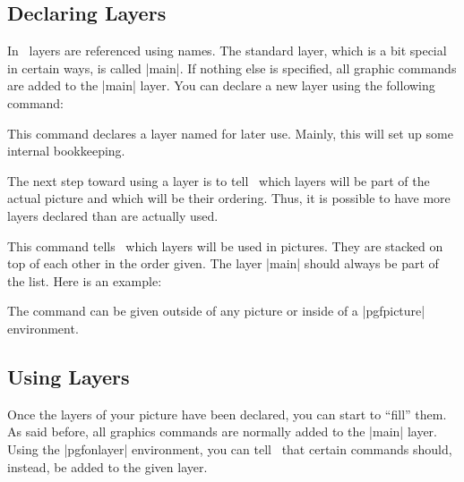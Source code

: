 \subsection{Declaring Layers}

In \pgfname\ layers are referenced using names. The standard layer,
which is a bit special in certain ways, is called |main|. If nothing
else is specified, all graphic commands are added to the |main|
layer. You can declare a new layer using the following command:

\begin{command}{\pgfdeclarelayer{}}
  This command declares a layer named  for later
  use. Mainly, this will set up some internal bookkeeping.
\end{command}

The next step toward using a layer is to tell \pgfname\ which layers
will be part of the actual picture and which will be their
ordering. Thus, it is possible to have more layers declared than are
actually used.

\begin{command}{\pgfsetlayers{}}
  This command tells \pgfname\ which layers will be used in
  pictures. They are stacked on top of each other in the order
  given. The layer |main| should always be part of the list. Here is
  an example:
\begin{codeexample}
\end{codeexample}

  The command can be given outside of any picture 
  or inside of a |pgfpicture| environment.
\end{command}


\subsection{Using Layers}

Once the layers of your picture have been declared, you can start to
``fill'' them. As said before, all graphics commands are normally
added to the |main| layer. Using the |{pgfonlayer}| environment, you
can tell \pgfname\ that certain commands should, instead, be added to
the given layer.

